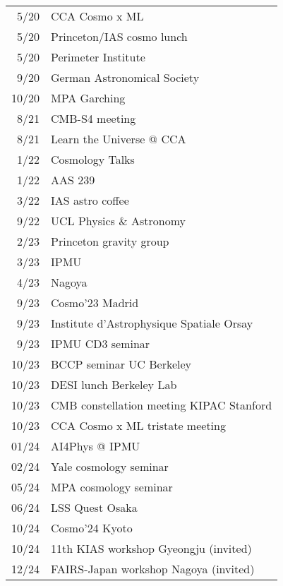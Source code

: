 \begin{tabular}{r l}
 5/20 & CCA Cosmo x ML \\
 5/20 & Princeton/IAS cosmo lunch \\
 5/20 & Perimeter Institute \\
 9/20 & German Astronomical Society \\
10/20 & MPA Garching \\
 8/21 & CMB-S4 meeting \\
 8/21 & Learn the Universe @ CCA \\
 1/22 & Cosmology Talks \\
 1/22 & AAS 239 \\
 3/22 & IAS astro coffee \\
 9/22 & UCL Physics \& Astronomy \\
 2/23 & Princeton gravity group \\
 3/23 & IPMU \\
 4/23 & Nagoya \\
 9/23 & Cosmo'23 Madrid \\
 9/23 & Institute d'Astrophysique Spatiale Orsay \\
 9/23 & IPMU CD3 seminar \\
10/23 & BCCP seminar UC Berkeley \\
10/23 & DESI lunch Berkeley Lab \\
10/23 & CMB constellation meeting KIPAC Stanford \\
10/23 & CCA Cosmo x ML tristate meeting \\
01/24 & AI4Phys @ IPMU \\
02/24 & Yale cosmology seminar \\
05/24 & MPA cosmology seminar \\
06/24 & LSS Quest Osaka \\
10/24 & Cosmo'24 Kyoto \\
10/24 & 11th KIAS workshop Gyeongju (invited) \\
12/24 & FAIRS-Japan workshop Nagoya (invited)
\end{tabular}
